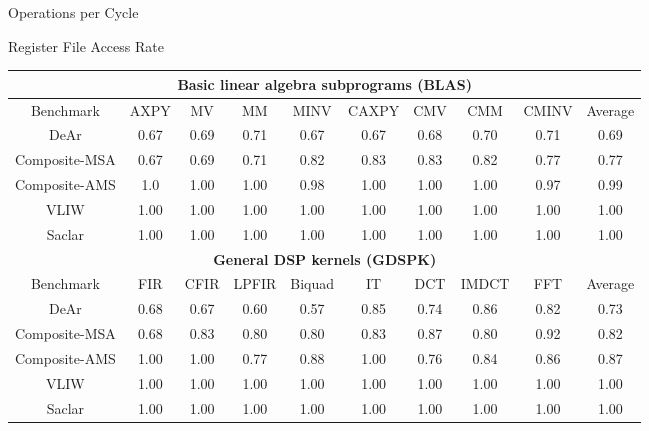 \documentclass{beamer}
\begin{document}
\begin{CJK}{UTF8}{bkai}
\begin{frame}{Operations per Cycle}
    \end{frame}

    \begin{frame}{Register File Access Rate}
        \begin{table}[!ht]
            \centering
            \resizebox{\columnwidth}{!}
            {
                \begin{tabular}{|c|c|c|c|c|c|c|c|c|c|}
                    \hline
                    \multicolumn{10}{|c|}{\textbf{Basic linear algebra subprograms (BLAS)}} \\ \hline
                    Benchmark  &  AXPY  &  MV  &  MM  &  MINV  &  CAXPY  &  CMV  &  CMM  &  CMINV  &  Average \\ \hline 
                    DeAr  &   0.67  &   0.69  &   0.71  &   0.67  &   0.67  &   0.68  &   0.70  &   0.71  &   0.69     \\ \hline
                    Composite-MSA  &   0.67  &   0.69  &  0.71  &   0.82  &   0.83  &   0.83  &   0.82  &   0.77  &  0.77     \\ \hline 
                    Composite-AMS  &   1.0  &   1.00  &   1.00  &   0.98  &   1.00  &   1.00  &   1.00  &   0.97  &   0.99     \\ \hline 
                    VLIW  &   1.00  &   1.00  &   1.00  &   1.00  &   1.00  &   1.00  &   1.00  &   1.00  &   1.00     \\ \hline 
                    Saclar  &   1.00  &   1.00  &   1.00  &   1.00  &   1.00  &   1.00  &   1.00  &   1.00  &   1.00     \\ \hline 
                    \multicolumn{10}{|c|}{\textbf{General DSP kernels (GDSPK)}}                     \\ \hline
                    Benchmark  &  FIR  &  CFIR  &  LPFIR  &  Biquad  &  IT  &  DCT  &  IMDCT  &  FFT  &  Average \\ \hline 
                    DeAr  &   0.68  &   0.67  &  0.60  &   0.57  &   0.85  &   0.74  &   0.86  &   0.82  &   0.73     \\ \hline 
                    Composite-MSA  &   0.68  &   0.83  &   0.80  &   0.80  &   0.83  &   0.87  &   0.80  &   0.92  &   0.82     \\ \hline 
                    Composite-AMS  &   1.00  &   1.00  &   0.77  &   0.88  &   1.00  &   0.76  &   0.84  &   0.86  &   0.87     \\ \hline 
                    VLIW  &   1.00  &   1.00  &   1.00  &   1.00  &   1.00  &   1.00  &   1.00  &   1.00  &   1.00     \\ \hline 
                    Saclar  &   1.00  &   1.00  &   1.00  &   1.00  &   1.00  &   1.00  &   1.00  &   1.00  &   1.00     \\ \hline 
                \end{tabular}
            }
    \end{table}
    \end{frame}


\end{CJK}
\end{document}

